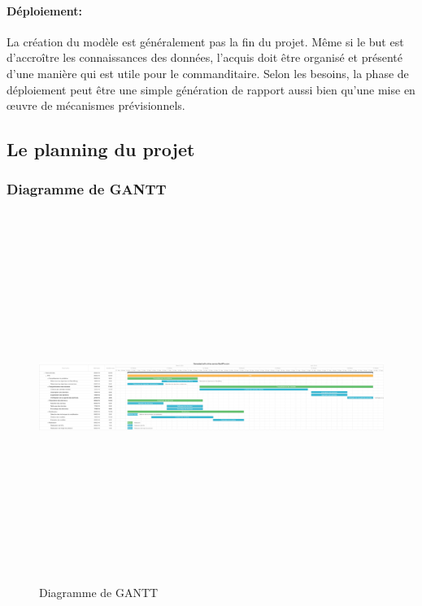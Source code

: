 	\paragraph{Déploiement:}
	La création du modèle est généralement pas la fin du projet. Même si le but est d'accroître les connaissances des données, l'acquis doit être organisé et présenté d'une manière qui est utile pour le commanditaire. Selon les besoins, la phase de déploiement peut être une simple génération de rapport aussi bien qu'une mise en œuvre de mécanismes prévisionnels.
	

	\begin{landscape}
	\subsection{Le planning du projet}
	\subsubsection{Diagramme de GANTT}
		\begin{figure}[H]
    			\centering
    			\includegraphics[width=26cm,height=12cm]{gantt.pdf}
    			\caption{Diagramme de GANTT}
    			\label{fig:gantt}
		\end{figure}
	\end{landscape}
	
